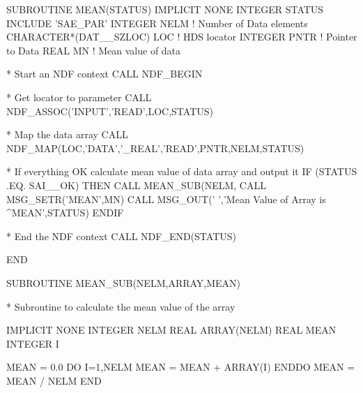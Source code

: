 \documentclass[twoside,11pt,nolof,chapters]{starlink}
\begin{document}
\begin{terminalv}
      SUBROUTINE MEAN(STATUS)
      IMPLICIT NONE
      INTEGER STATUS
      INCLUDE 'SAE_PAR'
      INTEGER NELM                       ! Number of Data elements
      CHARACTER*(DAT__SZLOC) LOC         ! HDS locator
      INTEGER PNTR                       ! Pointer to Data
      REAL MN                            ! Mean value of data

* Start an NDF context
      CALL NDF_BEGIN

* Get locator to parameter
      CALL NDF_ASSOC('INPUT','READ',LOC,STATUS)

* Map the data array
      CALL NDF_MAP(LOC,'DATA','_REAL','READ',PNTR,NELM,STATUS)

* If everything OK calculate mean value of data array and output it
      IF (STATUS .EQ. SAI__OK) THEN
          CALL MEAN_SUB(NELM,%
          CALL MSG_SETR('MEAN',MN)
          CALL MSG_OUT(' ','Mean Value of Array is ^MEAN',STATUS)
      ENDIF

* End the NDF context
      CALL NDF_END(STATUS)

      END


      SUBROUTINE MEAN_SUB(NELM,ARRAY,MEAN)

*  Subroutine to calculate the mean value of the array

      IMPLICIT NONE
      INTEGER NELM
      REAL ARRAY(NELM)
      REAL MEAN
      INTEGER I

      MEAN = 0.0
      DO I=1,NELM
         MEAN = MEAN + ARRAY(I)
      ENDDO
      MEAN = MEAN / NELM
      END

\end{terminalv}
\end{document}
